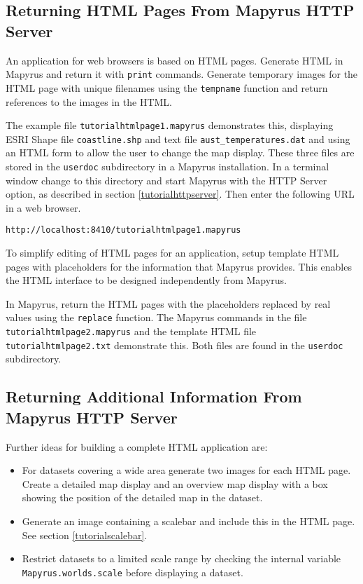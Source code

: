 \subsection{Returning HTML Pages From Mapyrus HTTP Server}

An application for web browsers is based on HTML pages.
Generate HTML in Mapyrus and return it with \texttt{print} commands.
Generate temporary images for the HTML page with
unique filenames using the
\texttt{tempname}
function and return references to the images in the HTML.

The example file \texttt{tutorialhtmlpage1.mapyrus} demonstrates
this, displaying ESRI Shape file
\texttt{coastline.shp}
and text file
\texttt{aust\_temperatures.dat}
and using an HTML form to allow
the user to change the map display.
These three files are stored in the \texttt{userdoc} subdirectory
in a Mapyrus installation.
In a terminal window change to this directory and
start Mapyrus with the HTTP Server option, as described in section
\ref{tutorialhttpserver}.
Then enter the following URL in a web browser.

\begin{verbatim}
http://localhost:8410/tutorialhtmlpage1.mapyrus
\end{verbatim}

To simplify editing of HTML pages for an application, setup
template HTML pages with placeholders for the information that
Mapyrus provides.  This enables the HTML interface to be designed
independently from Mapyrus.

In Mapyrus, return the HTML pages with the placeholders
replaced by real values using the
\texttt{replace}
function.  The Mapyrus commands in the file \texttt{tutorialhtmlpage2.mapyrus}
and the template HTML file \texttt{tutorialhtmlpage2.txt}
demonstrate this.  Both files are found in the
\texttt{userdoc} subdirectory.

\subsection{Returning Additional Information From Mapyrus HTTP Server}

Further ideas for building a complete HTML application are:

\begin{itemize}
\item
For datasets covering a wide area generate two images for
each HTML page.  Create a detailed map display and an overview map display
with a box showing the position of the detailed map in the dataset.

\item
Generate an image containing a scalebar
and include this in the HTML page.  See section \ref{tutorialscalebar}.

\item
Restrict datasets to a limited scale range by checking the
internal variable
\texttt{Mapyrus.worlds.scale} before displaying a dataset.
\end{itemize}

